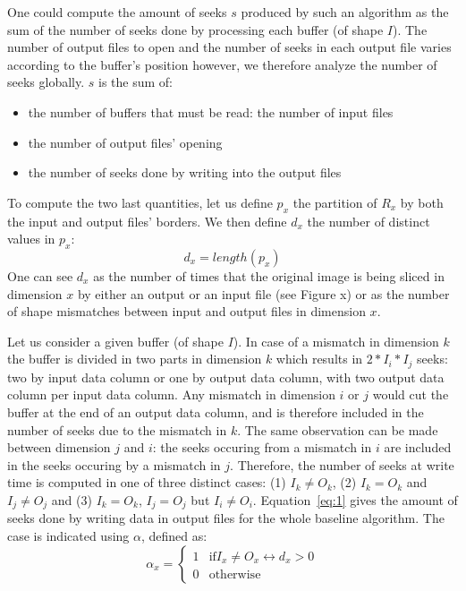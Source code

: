\documentclass[conference]{IEEEtran}
\begin{document}
One could compute the amount of seeks $s$ produced by such an algorithm as the
sum of the number of seeks done by processing each buffer (of shape $I$). The
number of output files to open and the number of seeks in each output file varies
according to the buffer's position however, we therefore analyze the number of
seeks globally. $s$ is the sum of:
\begin{itemize}
  \item the number of buffers that must be read: the number of input files
  \item the number of output files' opening
  \item the number of seeks done by writing into the output files
\end{itemize}

To compute the two last quantities, let us define $p_x$ the partition of $R_x$
by both the input and output files' borders. We then define $d_x$ the number of
distinct values in $p_x$:
$$d_x=length(p_x)$$
One can see $d_x$ as the number of times that the original image is being sliced
in dimension $x$ by either an output or an input file (see Figure x) or as the
number of shape mismatches between input and output files in dimension $x$.

Let us consider a given buffer (of shape $I$). In case of a mismatch in dimension
$k$ the buffer is divided in two parts in dimension $k$ which results in $2*I_i*I_j$
seeks: two by input data column or one by output data column, with two output
data column per input data column. Any mismatch in dimension $i$ or $j$ would
cut the buffer at the end of an output data column, and is therefore included in
the number of seeks due to the mismatch in $k$. The same observation can be made
between dimension $j$ and $i$: the seeks occuring from a mismatch in $i$ are
included in the seeks occuring by a mismatch in $j$. Therefore, the number of
seeks at write time is computed in one of three distinct cases:
(1) $I_k \neq O_k$, (2) $I_k = O_k$ and $I_j \neq O_j$ and (3) $I_k = O_k$,
$I_j = O_j$ but $I_i \neq O_i$. Equation~\ref{eq:1} gives the amount of seeks
done by writing data in output files for the whole baseline algorithm.
The case is indicated using $\alpha$, defined as: \\
$$\alpha_x = \begin{cases}
   1 & \mathrm{if} I_x \neq O_x \leftrightarrow d_x > 0 \\
   0 & \mathrm{otherwise}
\end{cases}$$
\end{document}
